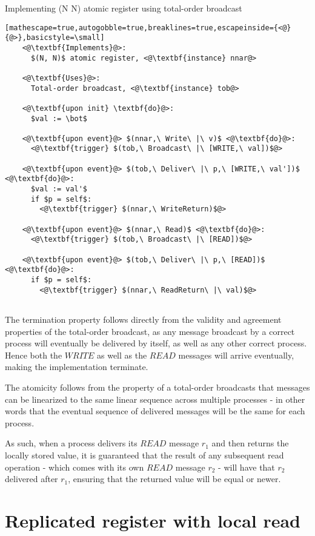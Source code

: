 \documentclass[a4paper]{scrreprt}
\begin{document}
\begin{library}{Implementing (N N) atomic register using total-order broadcast}
  \begin{lstlisting}[mathescape=true,autogobble=true,breaklines=true,escapeinside={<@}{@>},basicstyle=\small]
    <@\textbf{Implements}@>:
      $(N, N)$ atomic register, <@\textbf{instance} nnar@>

    <@\textbf{Uses}@>:
      Total-order broadcast, <@\textbf{instance} tob@>

    <@\textbf{upon init} \textbf{do}@>:
      $val := \bot$

    <@\textbf{upon event}@> $(nnar,\ Write\ |\ v)$ <@\textbf{do}@>:
      <@\textbf{trigger} $(tob,\ Broadcast\ |\ [WRITE,\ val])$@>

    <@\textbf{upon event}@> $(tob,\ Deliver\ |\ p,\ [WRITE,\ val'])$ <@\textbf{do}@>:
      $val := val'$
      if $p = self$:
        <@\textbf{trigger} $(nnar,\ WriteReturn)$@>

    <@\textbf{upon event}@> $(nnar,\ Read)$ <@\textbf{do}@>:
      <@\textbf{trigger} $(tob,\ Broadcast\ |\ [READ])$@>

    <@\textbf{upon event}@> $(tob,\ Deliver\ |\ p,\ [READ])$ <@\textbf{do}@>:
      if $p = self$:
        <@\textbf{trigger} $(nnar,\ ReadReturn\ |\ val)$@>
      
  \end{lstlisting}
\end{library}

The termination property follows directly from the validity and agreement
properties of the total-order broadcast, as any message broadcast by a correct
process will eventually be delivered by itself, as well as any other correct
process. Hence both the $WRITE$ as well as the $READ$ messages will arrive
eventually, making the implementation terminate.

The atomicity follows from the property of a total-order broadcasts that
messages can be linearized to the same linear sequence across multiple
processes - in other words that the eventual sequence of delivered messages
will be the same for each process.

As such, when a process delivers its $READ$ message $r_1$ and then returns the
locally stored value, it is guaranteed that the result of any subsequent read
operation - which comes with its own $READ$ message $r_2$ - will have that
$r_2$ delivered after $r_1$, ensuring that the returned value will be equal or
newer.

\section{Replicated register with local read}
\end{document}
